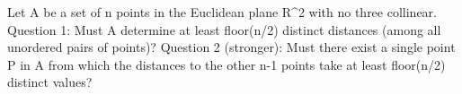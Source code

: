 Let A be a set of n points in the Euclidean plane R^2 with no three collinear.
Question 1: Must A determine at least floor(n/2) distinct distances (among all unordered pairs of points)?
Question 2 (stronger): Must there exist a single point P in A from which the distances to the other n-1 points take at least floor(n/2) distinct values?
